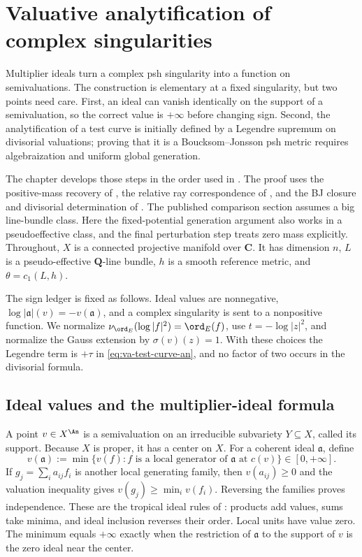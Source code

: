 \chapter{Valuative analytification of complex singularities}
\label{chap:valuative-analytification}

Multiplier ideals turn a complex psh singularity into a function on
semivaluations.
The construction is elementary at a fixed singularity, but two points need
care.
First, an ideal can vanish identically on the support of a semivaluation, so
the correct value is $+\infty$ before changing sign.
Second, the analytification of a test curve is initially defined by a
Legendre supremum on divisorial valuations; proving that it is a
Boucksom--Jonsson psh metric requires algebraization and uniform global
generation.

The chapter develops those steps in the order used in
\cite{DXZ23}.
The proof uses the positive-mass recovery of
, the relative ray correspondence of
, and the BJ closure and divisorial determination
of . The published comparison section assumes
a big line-bundle class. Here the fixed-potential generation argument also
works in a pseudoeffective class, and the final perturbation step treats
zero mass explicitly.
Throughout, $X$ is a connected projective manifold over $\mathbf C$.
It has dimension $n$, $L$ is a pseudo-effective
$\mathbf Q$-line bundle, $h$ is a smooth reference metric, and
$\theta=c_1(L,h)$.

The sign ledger is fixed as follows.  Ideal values are nonnegative,
$\log|\mathfrak a|(v)=-v(\mathfrak a)$, and a complex singularity is
sent to a nonpositive function.  We normalize
$\nu_{\ord_E}(\log|f|^2)=\ord_E(f)$, use
$t=-\log|z|^2$, and normalize the Gauss extension by
$\sigma(v)(z)=1$.  With these choices the Legendre term is $+\tau$
in \eqref{eq:va-test-curve-an}, and no factor of two occurs in the
divisorial formula.

\section{Ideal values and the multiplier-ideal formula}
\label{sec:va-ideal-values}

A point $v\in X^{\An}$ is a semivaluation on an irreducible subvariety
$Y\subseteq X$, called its support.
Because $X$ is proper, it has a center on $X$.
For a coherent ideal $\mathfrak a$, define
\[
 v(\mathfrak a)
 :=\min\{v(f):f\text{ is a local generator of }\mathfrak a
                    \text{ at }c(v)\}\in[0,+\infty].
\tag{56.1}\label{eq:va-ideal-value}
\]
If $g_j=\sum_i a_{ij}f_i$ is another local generating family, then
$v(a_{ij})\geq0$ and the valuation inequality gives
$v(g_j)\geq\min_i v(f_i)$. Reversing the families proves independence.
These are the tropical ideal rules of
: products add values, sums take minima,
and ideal inclusion reverses their order. Local units have value zero.
The minimum equals $+\infty$ exactly when the restriction of $\mathfrak a$ to
the support of $v$ is the zero ideal near the center.

